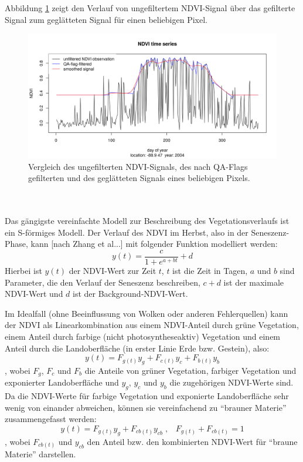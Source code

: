 \documentclass[]{article}
\begin{document}
Abbildung \ref{vglp} zeigt den Verlauf von ungefiltertem NDVI-Signal über das gefilterte Signal zum geglätteten Signal für einen beliebigen Pixel.
\begin{figure}
  \includegraphics[width=1.\textwidth]{vglp.png}
	\caption{Vergleich des ungefilterten NDVI-Signals, des nach QA-Flags gefilterten und des geglätteten Signals eines beliebigen Pixels.}
	\label{vglp}
\end{figure}
\\ \\
Das gängigste vereinfachte Modell zur Beschreibung des Vegetationsverlaufs ist ein S-förmiges Modell. Der Verlauf des NDVI im Herbst, also in der Seneszenz-Phase, kann [nach Zhang et al...] mit folgender Funktion modelliert werden:
\begin{equation}
y(t)=\frac{c}{1+e^{a+bt}}+d
\label{eq1}
\end{equation}
Hierbei ist $y(t)$ der NDVI-Wert zur Zeit $t$, $t$ ist die Zeit in Tagen, $a$ und $b$ sind Parameter, die den Verlauf der Seneszenz beschreiben, $c+d$ ist der maximale NDVI-Wert und $d$ ist der Background-NDVI-Wert.

Im Idealfall (ohne Beeinflussung von Wolken oder anderen Fehlerquellen) kann der NDVI als Linearkombination aus einem NDVI-Anteil durch grüne Vegetation, einem Anteil durch farbige (nicht photosyntheseaktiv) Vegetation und einem Anteil durch die Landoberfläche (in erster Linie Erde bzw. Gestein), also:
\begin{equation}
y(t)=F_{g(t)}y_g+F_{c(t)}y_c+F_{b(t)}y_b
\end{equation}
, wobei $F_g$, $F_c$ und $F_b$ die Anteile von grüner Vegetation, farbiger Vegetation und exponierter Landoberfläche und $y_g$, $y_c$ und $y_b$ die zugehörigen NDVI-Werte sind.
Da die NDVI-Werte für farbige Vegetation und exponierte Landoberfläche sehr wenig von einander abweichen, können sie vereinfachend zu \enquote{brauner Materie} zusammengefasst werden:
\begin{equation}
y(t)=F_{g(t)}y_g + F_{cb(t)}y_{cb} \;, \;\;\; F_{g(t)}+F_{cb(t)}=1
\label{eq3}
\end{equation}
, wobei $F_{cb(t)}$ und $y_{cb}$ den Anteil bzw. den kombinierten NDVI-Wert für \enquote{braune Materie} darstellen. 
\end{document}

